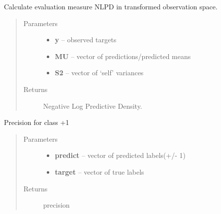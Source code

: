 \documentclass[letterpaper,10pt,english]{sphinxmanual}
\begin{document}

\begin{fulllineitems}
\label{pyGPs.Validation:pyGPs.Validation.valid.NLPD}
Calculate evaluation measure NLPD in transformed observation space.
\begin{quote}\begin{description}
\item[{Parameters}] \leavevmode\begin{itemize}
\item {} 
\textbf{y} -- observed targets

\item {} 
\textbf{MU} -- vector of predictions/predicted means

\item {} 
\textbf{S2} -- vector of `self' variances

\end{itemize}

\item[{Returns}] \leavevmode
Negative Log Predictive Density.

\end{description}\end{quote}

\end{fulllineitems}


\begin{fulllineitems}
\label{pyGPs.Validation:pyGPs.Validation.valid.Prec}
Precision for class +1
\begin{quote}\begin{description}
\item[{Parameters}] \leavevmode\begin{itemize}
\item {} 
\textbf{predict} -- vector of predicted labels(+/- 1)

\item {} 
\textbf{target} -- vector of true labels

\end{itemize}

\item[{Returns}] \leavevmode
precision

\end{description}\end{quote}

\end{fulllineitems}
\end{document}
